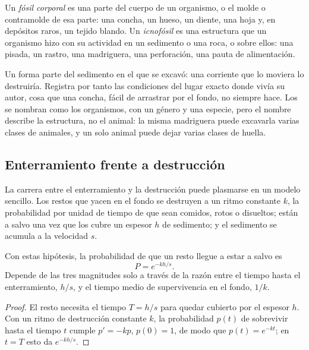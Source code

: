 \begin{definition}\label{def:b2:palaeoenvironments:fossil-kinds}
Un \emph{fósil corporal} es una parte del cuerpo de un organismo, o el molde o contramolde
de esa parte: una concha, un hueso, un diente, una hoja y, en depósitos raros, un tejido blando. Un
\emph{icnofósil} es una estructura que un organismo hizo con su actividad en un
sedimento o una roca, o sobre ellos: una pisada, un rastro, una madriguera, una perforación, una pauta de alimentación.
\end{definition}

Un  forma parte del sedimento en el que se excavó: una corriente que lo moviera lo destruiría.
Registra por tanto las condiciones del lugar exacto donde vivía su autor, cosa que una concha,
fácil de arrastrar por el fondo, no siempre hace. Los  se nombran como los organismos, con un
género y una especie, pero el nombre describe la estructura, no el animal: la misma madriguera puede
excavarla varias clases de animales, y un solo animal puede dejar varias clases de huella.

\subsection*{Enterramiento frente a destrucción}

La carrera entre el enterramiento y la destrucción puede plasmarse en un modelo sencillo. Los restos que yacen en el
fondo se destruyen a un ritmo constante $k$, la probabilidad por unidad de tiempo de que sean comidos,
rotos o disueltos; están a salvo una vez que los cubre un espesor $h$ de sedimento; y el
sedimento se acumula a la velocidad $s$.

\begin{proposition}\label{prop:b2:palaeoenvironments:burial}
Con estas hipótesis, la probabilidad de que un resto llegue a estar a salvo es
\[
  P = e^{-kh/s}.
\]
Depende de las tres magnitudes solo a través de la razón entre el tiempo hasta el enterramiento, $h/s$, y el
tiempo medio de supervivencia en el fondo, $1/k$.
\end{proposition}

\begin{proof}
El resto necesita el tiempo $T = h/s$ para quedar cubierto por el espesor $h$. Con un ritmo de
destrucción constante $k$, la probabilidad $p(t)$ de sobrevivir hasta el tiempo $t$ cumple $p' = -kp$, $p(0) =
1$, de modo que $p(t) = e^{-kt}$; en $t = T$ esto da $e^{-kh/s}$.
\end{proof}

